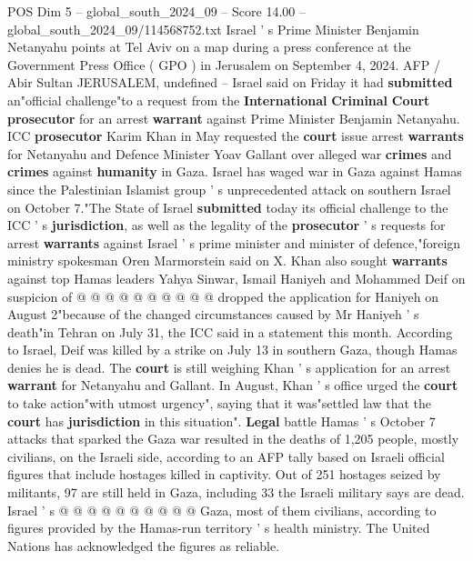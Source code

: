 \begin{textsample}{POS Dim 5 – global\_south\_2024\_09 – Score 14.00 – global\_south\_2024\_09/114568752.txt}  \label{ex:f5_pos_254}
Israel ' s Prime Minister Benjamin Netanyahu points at Tel Aviv on a map during a press conference at the Government Press Office ( GPO ) in Jerusalem on September 4, 2024.
AFP / Abir Sultan JERUSALEM, undefined -- Israel said on Friday it had \textbf{submitted} an"official challenge"to a request from the \textbf{International} \textbf{Criminal} \textbf{Court} \textbf{prosecutor} for an arrest \textbf{warrant} against Prime Minister Benjamin Netanyahu.
ICC \textbf{prosecutor} Karim Khan in May requested the \textbf{court} issue arrest \textbf{warrants} for Netanyahu and Defence Minister Yoav Gallant over alleged war \textbf{crimes} and \textbf{crimes} against \textbf{humanity} in Gaza.
Israel has waged war in Gaza against Hamas since the Palestinian Islamist group ' s unprecedented attack on southern Israel on October 7."The State of Israel \textbf{submitted} today its official challenge to the ICC ' s \textbf{jurisdiction}, as well as the legality of the \textbf{prosecutor} ' s requests for arrest \textbf{warrants} against Israel ' s prime minister and minister of defence,"foreign ministry spokesman Oren Marmorstein said on X.
Khan also sought \textbf{warrants} against top Hamas leaders Yahya Sinwar, Ismail Haniyeh and Mohammed Deif on suspicion of @ @ @ @ @ @ @ @ @ @ dropped the application for Haniyeh on August 2"because of the changed circumstances caused by Mr Haniyeh ' s death"in Tehran on July 31, the ICC said in a statement this month.
According to Israel, Deif was killed by a strike on July 13 in southern Gaza, though Hamas denies he is dead.
The \textbf{court} is still weighing Khan ' s application for an arrest \textbf{warrant} for Netanyahu and Gallant.
In August, Khan ' s office urged the \textbf{court} to take action"with utmost urgency", saying that it was"settled law that the \textbf{court} has \textbf{jurisdiction} in this situation". \textbf{Legal} battle Hamas ' s October 7 attacks that sparked the Gaza war resulted in the deaths of 1,205 people, mostly civilians, on the Israeli side, according to an AFP tally based on Israeli official figures that include hostages killed in captivity.
Out of 251 hostages seized by militants, 97 are still held in Gaza, including 33 the Israeli military says are dead.
Israel ' s @ @ @ @ @ @ @ @ @ @ Gaza, most of them civilians, according to figures provided by the Hamas-run territory ' s health ministry.
The United Nations has acknowledged the figures as reliable.

\end{textsample}
